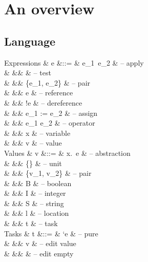 
\newpage
\section{An overview}


\subsection{Language}

\begin{grammar}
  Expressions
    & e      &::= & e_1\ e_2                    & – apply \\
    &        &\mid&           & – test \\
    &        &\mid& \{e_1, e_2\}                & – pair \\
    &        &\mid& \Ref e                      & – reference \\
    &        &\mid& !e                          & – dereference \\
    &        &\mid& e_1 := e_2                  & – assign \\
    &        &\mid& e_1 \star e_2               & – operator \\
    &        &\mid& x                           & – variable \\
    &        &\mid& v                           & – value \\
  Values
    & v      &::= & \lambda x.\ e               & – abstraction \\
    &        &\mid& \{\}                        & – unit \\
    &        &\mid& \{v_1, v_2\}                & – pair \\
    &        &\mid& B \in \BB                   & – boolean \\
    &        &\mid& I \in \ZZ                   & – integer \\
    &        &\mid& S \in \SS                   & – string \\
    &        &\mid& l                           & – location \\
    &        &\mid& t                           & – task \\
  Tasks
    & t      &::= & `e                          & – pure \\
    &        &\mid& \Edit v                     & – edit value \\
    &        &\mid& \Empty \tau                 & – edit empty \\

\end{grammar}
